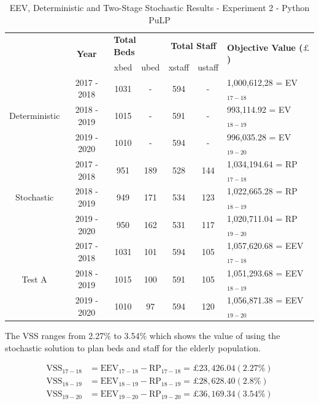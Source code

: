 \documentclass[../thesis.tex]{subfiles}
\begin{document}
\begin{table}[h!]
    \centering
    \begin{tabular}{ccccccl}\toprule
 & \multirow{2}{*}{\textbf{Year}}& \multicolumn{2}{l}{\textbf{Total Beds}} & \multicolumn{2}{c}{\textbf{Total Staff}} & \multirow{2}{*}{\textbf{Objective Value ($\pounds$)}}\\ \cmidrule(lr){3-4} \cmidrule(lr){5-6}
&& xbed           & ubed          & xstaff         & ustaff         \\ \midrule
     \multirow{3}{*}{Deterministic} & 2017 - 2018 & 1031 & - &  594 & - & 1,000,612,28 =  EV$_{17-18}$ \\ 
      & 2018 - 2019 & 1015 & - & 591 & - & 993,114.92 =  EV$_{18-19}$ \\
      & 2019 - 2020 & 1010 & - & 594 & - & 996,035.28 =  EV$_{19-20}$\\\midrule
     \multirow{3}{*}{Stochastic} & 2017 - 2018 & 951 & 189 & 528 & 144 & 1,034,194.64 =  RP$_{17-18}$ \\ 
      & 2018 - 2019 & 949 & 171 & 534 & 123 & 1,022,665.28 =  RP$_{18-19}$ \\
      & 2019 - 2020 & 950 & 162 & 531 & 117 & 1,020,711.04 =  RP$_{19-20}$\\ \midrule
      \multirow{3}{*}{Test A} & 2017 - 2018 &1031 & 101 & 594 & 105 & 1,057,620.68 = EEV$_{17-18}$\\
      & 2018 - 2019 &1015 & 100 & 591 & 105 & 1,051,293.68 = EEV$_{18-19}$\\
      & 2019 - 2020 &1010 & 97 & 594 & 120 & 1,056,871.38 = EEV$_{19-20}$\\\bottomrule      
    \end{tabular}
    \caption{EEV, Deterministic and Two-Stage Stochastic Results - Experiment 2 - Python PuLP}
    \label{tab:eevdetstocresultspy2}
\end{table}

The VSS ranges from 2.27\% to 3.54\% which shows the value of using the stochastic solution to plan beds and staff for the elderly population.

\begin{align}
    \text{VSS}_{17-18} &= \text{EEV}_{17-18} - \text{RP}_{17-18} = \pounds23,426.04 (2.27\%)  \\
    \text{VSS}_{18-19} &= \text{EEV}_{18-19} - \text{RP}_{18-19} = \pounds28,628.40 (2.8\%)  \\
    \text{VSS}_{19-20} &= \text{EEV}_{19-20} - \text{RP}_{19-20} = \pounds36,169.34 (3.54\%)  
\end{align}
\end{document}
